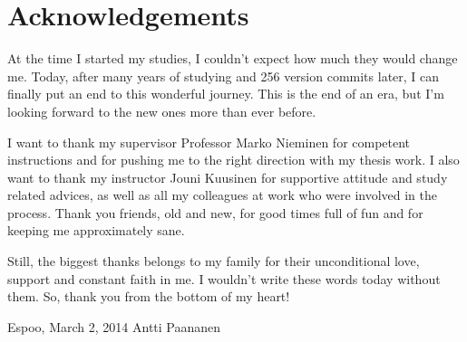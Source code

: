 \documentclass[12pt,a4paper,oneside,pdftex]{report}
\newcommand{\DATE}{March 2, 2014}
\newcommand{\AUTHOR}{Antti Paananen}
\begin{document}




\chapter*{Acknowledgements}

At the time I started my studies, I couldn't expect how much they would change me.
Today, after many years of studying and 256 version commits later, I can finally put an end to this wonderful journey.
This is the end of an era, but I'm looking forward to the new ones more than ever before.

I want to thank my supervisor Professor Marko Nieminen for competent instructions and for pushing me to the right direction with my thesis work. 
I also want to thank my instructor Jouni Kuusinen for supportive attitude and study related advices, as well as all my colleagues at work who were involved in the process.
Thank you friends, old and new, for good times full of fun and for keeping me approximately sane.

Still, the biggest thanks belongs to my family for their unconditional love, support and constant faith in me. I wouldn't write these words today without them.
So, thank you from the bottom of my heart! 

\vskip 10mm

\noindent Espoo, \DATE
\vskip 5mm
\noindent\AUTHOR

\cleardoublepage
% 
\end{document}
